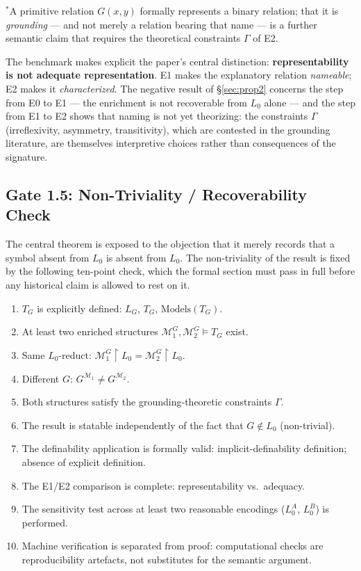 \documentclass[11pt]{article}
\theoremstyle{plain}
\theoremstyle{definition}
\theoremstyle{remark}
\begin{document}
\noindent $^{*}$A primitive relation $G(x,y)$ formally represents a
binary relation; that it is \emph{grounding} --- and not merely a
relation bearing that name --- is a further semantic claim that
requires the theoretical constraints $\Gamma$ of E2.

The benchmark makes explicit the paper's central distinction:
\textbf{representability is not adequate representation}. E1 makes the
explanatory relation \emph{nameable}; E2 makes it \emph{characterized}.
The negative result of \S\ref{sec:prop2} concerns the step from E0 to
E1 --- the enrichment is not recoverable from $L_0$ alone --- and the
step from E1 to E2 shows that naming is not yet theorizing: the
constraints $\Gamma$ (irreflexivity, asymmetry, transitivity), which
are contested in the grounding literature, are themselves interpretive
choices rather than consequences of the signature.

\subsection{Gate 1.5: Non-Triviality / Recoverability Check}
\label{sec:gate15}

The central theorem is exposed to the objection that it merely records
that a symbol absent from $L_0$ is absent from $L_0$. The
non-triviality of the result is fixed by the following ten-point check,
which the formal section must pass in full before any historical claim
is allowed to rest on it.

\begin{enumerate}
\item[T1.] $T_G$ is explicitly defined: $L_G$, $T_G$, $\mathrm{Models}(T_G)$.
\item[T2.] At least two enriched structures $\mathcal M_1^G, \mathcal M_2^G \models T_G$ exist.
\item[T3.] Same $L_0$-reduct: $\mathcal M_1^G\!\upharpoonright L_0 = \mathcal M_2^G\!\upharpoonright L_0$.
\item[T4.] Different $G$: $G^{\mathcal M_1} \neq G^{\mathcal M_2}$.
\item[T5.] Both structures satisfy the grounding-theoretic constraints $\Gamma$.
\item[T6.] The result is statable independently of the fact that $G \notin L_0$ (non-trivial).
\item[T7.] The definability application is formally valid: implicit-definability definition; absence of explicit definition.
\item[T8.] The E1/E2 comparison is complete: representability vs.\ adequacy.
\item[T9.] The sensitivity test across at least two reasonable encodings ($L_0^A$, $L_0^B$) is performed.
\item[T10.] Machine verification is separated from proof: computational checks are reproducibility artefacts, not substitutes for the semantic argument.
\end{enumerate}
\end{document}
